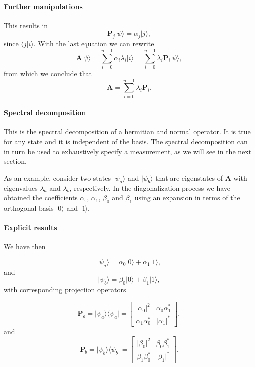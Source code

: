\paragraph{Further manipulations}

This results in
\[
\bm{P}_{j}\vert \psi\rangle=\alpha_j\vert j\rangle,
\]
since $\langle j\vert i\rangle$.
With the last equation we can rewrite
\[
\bm{A}\vert \psi \rangle = \sum_{i=0}^{n-1}\alpha_i\lambda_i\vert i\rangle=\sum_{i=0}^{n-1}\lambda_i\bm{P}_i\vert \psi\rangle,
\]
from which we conclude that
\[
\bm{A}=\sum_{i=0}^{n-1}\lambda_i\bm{P}_i.
\]


\paragraph{Spectral decomposition}

This is the spectral decomposition of a hermitian and normal
operator. It is true for any state and it is independent of the
basis. The spectral decomposition can in turn be used to exhaustively
specify a measurement, as we will see in the next section.

As an example, consider two states $\vert \psi_a\rangle$ and $\vert
\psi_b\rangle$ that are eigenstates of $\bm{A}$ with eigenvalues
$\lambda_a$ and $\lambda_b$, respectively. In the diagonalization
process we have obtained the coefficients $\alpha_0$, $\alpha_1$,
$\beta_0$ and $\beta_1$ using an expansion in terms of the orthogonal
basis $\vert 0\rangle$ and $\vert 1\rangle$.


\paragraph{Explicit results}

We have then

\[
\vert \psi_a\rangle = \alpha_0\vert 0\rangle+\alpha_1\vert 1\rangle,
\]
and
\[
\vert \psi_b\rangle = \beta_0\vert 0\rangle+\beta_1\vert 1\rangle,
\]
with corresponding projection operators

\[
\bm{P}_a=\vert \psi_a\rangle \langle \psi_a\vert = \begin{bmatrix} \vert \alpha_0\vert^2 &\alpha_0\alpha_1^* \\
                                                                   \alpha_1\alpha_0^* & \vert \alpha_1\vert^* \end{bmatrix},
\]    
and
\[
\bm{P}_b=\vert \psi_b\rangle \langle \psi_b\vert = \begin{bmatrix} \vert \beta_0\vert^2 &\beta_0\beta_1^* \\
                                                                   \beta_1\beta_0^* & \vert \beta_1\vert^* \end{bmatrix}.
\]



